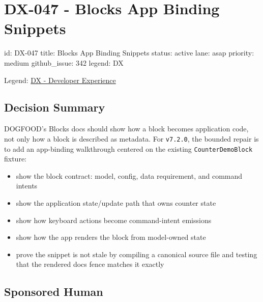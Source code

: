 \chapter{DX-047 - Blocks App Binding Snippets}\label{record-143}

\smallskip

\begin{RecordMeta}
id: DX-047
title: Blocks App Binding Snippets
status: active
lane: asap
priority: medium
github_issue: 342
legend: DX

\end{RecordMeta}

Legend: \href{https://github.com/flyingrobots/bijou/blob/1853ad902f6bf219326409e7f743a5a1d6517dbc/docs/legends/DX-developer-experience.md}{DX - Developer Experience}

\section{Decision Summary}\label{record-143-decision-summary}

DOGFOOD's Blocks docs should show how a block becomes application code, not only how a block is described as metadata. For \texttt{v\allowbreak{}7\allowbreak{}.\allowbreak{}2\allowbreak{}.\allowbreak{}0}, the bounded repair is to add an app-binding walkthrough centered on the existing \texttt{C\allowbreak{}o\allowbreak{}u\allowbreak{}n\allowbreak{}t\allowbreak{}e\allowbreak{}r\allowbreak{}D\allowbreak{}e\allowbreak{}m\allowbreak{}o\allowbreak{}B\allowbreak{}l\allowbreak{}o\allowbreak{}c\allowbreak{}k} fixture:

\begin{itemize}
\tightlist
\item
  show the block contract: model, config, data requirement, and command intents
\item
  show the application state/update path that owns counter state
\item
  show how keyboard actions become command-intent emissions
\item
  show how the app renders the block from model-owned state
\item
  prove the snippet is not stale by compiling a canonical source file and testing that the rendered docs fence matches it exactly
\end{itemize}

\section{Sponsored Human}\label{record-143-sponsored-human}

